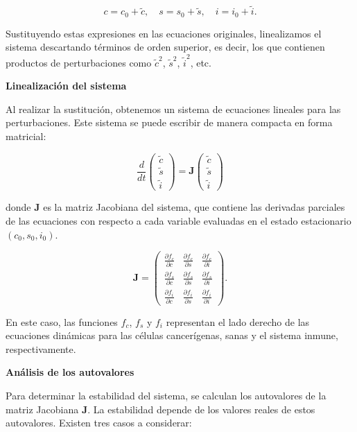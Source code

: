 \documentclass{article}
\begin{document}
\[
c = c_0 + \tilde{c}, \quad s = s_0 + \tilde{s}, \quad i = i_0 + \tilde{i}.
\]

Sustituyendo estas expresiones en las ecuaciones originales, linealizamos el sistema descartando términos de orden superior, es decir, los que contienen productos de perturbaciones como $\tilde{c}^2$, $\tilde{s}^2$, $\tilde{i}^2$, etc.
\vspace{0.5cm}

\textbf{Linealización del sistema}
\vspace{0.2cm}

Al realizar la sustitución, obtenemos un sistema de ecuaciones lineales para las perturbaciones. Este sistema se puede escribir de manera compacta en forma matricial:

\[
\frac{d}{dt} 
\begin{pmatrix}
\tilde{c} \\
\tilde{s} \\
\tilde{i}
\end{pmatrix}
= 
\mathbf{J}
\begin{pmatrix}
\tilde{c} \\
\tilde{s} \\
\tilde{i}
\end{pmatrix}
\]

donde $\mathbf{J}$ es la matriz Jacobiana del sistema, que contiene las derivadas parciales de las ecuaciones con respecto a cada variable evaluadas en el estado estacionario $(c_0, s_0, i_0)$.

\[
\mathbf{J} = 
\begin{pmatrix}
\frac{\partial f_c}{\partial c} & \frac{\partial f_c}{\partial s} & \frac{\partial f_c}{\partial i} \\
\frac{\partial f_s}{\partial c} & \frac{\partial f_s}{\partial s} & \frac{\partial f_s}{\partial i} \\
\frac{\partial f_i}{\partial c} & \frac{\partial f_i}{\partial s} & \frac{\partial f_i}{\partial i}
\end{pmatrix}.
\]

En este caso, las funciones $f_c$, $f_s$ y $f_i$ representan el lado derecho de las ecuaciones dinámicas para las células cancerígenas, sanas y el sistema inmune, respectivamente.
\vspace{0.5cm}

\textbf{Análisis de los autovalores}
\vspace{0.2cm}

Para determinar la estabilidad del sistema, se calculan los autovalores de la matriz Jacobiana $\mathbf{J}$. La estabilidad depende de los valores reales de estos autovalores. Existen tres casos a considerar:
\end{document}
